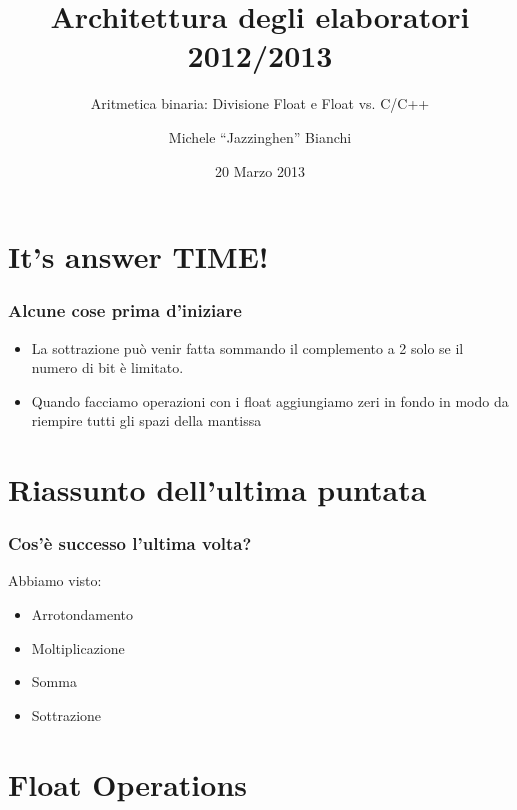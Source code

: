 \documentclass{beamer}
\title[Arch2013] %
{Architettura degli elaboratori 2012/2013}
\subtitle{Aritmetica binaria: Divisione Float e Float vs. C/C++}
\author{Michele ``Jazzinghen'' Bianchi\inst{1}}
\institute[DISI] %
{
  \inst{1}%
  Dipartimento di Ingegneria e Scienze dell'Informazione\\
  Universtià degli Studi di Trento
}
\date[2013-03-20] %
{20 Marzo 2013}
\begin{document}
	\frame{\titlepage}
	\section{It's answer TIME!}
	\begin{frame}
    \frametitle{Alcune cose prima d'iniziare}
		\begin{itemize}
			\item La sottrazione può venir fatta sommando il complemento a
				2 solo se il numero di bit è limitato.
		  \item Quando facciamo operazioni con i float aggiungiamo zeri
		  		in fondo in modo da riempire tutti gli spazi della mantissa
		\end{itemize}
	\end{frame}   
  
	\section{Riassunto dell'ultima puntata}  
  \begin{frame}
    \frametitle{Cos'è successo l'ultima volta?}
		Abbiamo visto:    
    \begin{itemize}
    		\item Arrotondamento
    		\item Moltiplicazione
    		\item Somma
    		\item Sottrazione
    \end{itemize}
  \end{frame}
	
	\section{Float Operations}
\end{document}
